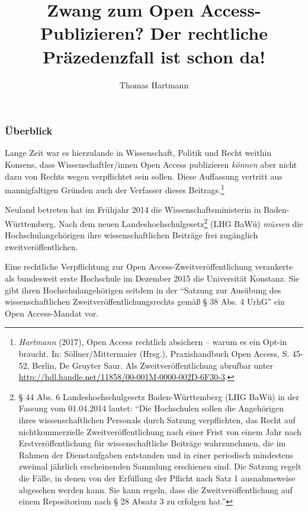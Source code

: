 \documentclass[a4paper,
fontsize=11pt,
oneside,
numbers=noperiodatend,
parskip=half-,
bibliography=totoc,
final
]{scrartcl}
\title{\LARGE{Zwang zum Open Access-Publizieren? Der rechtliche Präzedenzfall ist schon da!}} %
\author{Thomas Hartmann} %
\date{}
\begin{document}
\maketitle
\thispagestyle{fancyplain} 


\hypertarget{uxfcberblick}{%
\subsubsection{Überblick}\label{uxfcberblick}}

Lange Zeit war es hierzulande in Wissenschaft, Politik und Recht weithin
Konsens, dass Wissenschaftler/innen Open Access publizieren
\emph{können} aber nicht dazu von Rechts wegen verpflichtet sein sollen.
Diese Auffassung vertritt aus mannigfaltigen Gründen auch der Verfasser
dieses Beitrags.\footnote{\emph{Hartmann} (2017), Open Access rechtlich
  absichern -- warum es ein Opt-in braucht. In: Söllner/Mittermaier
  (Hrsg.), Praxishandbuch Open Access, S. 45-52, Berlin, De Gruyter
  Saur. Als Zweitveröffentlichung abrufbar unter
  \url{http://hdl.handle.net/11858/00-001M-0000-002D-6F30-3}.}

Neuland betreten hat im Frühjahr 2014 die Wissenschaftsministerin in
Baden-Württemberg. Nach dem neuen Landeshochschulgesetz\footnote{§ 44
  Abs. 6 Landeshochschulgesetz Baden-Württemberg (LHG BaWü) in der
  Fassung vom 01.04.2014 lautet: \enquote{Die Hochschulen sollen die
  Angehörigen ihres wissenschaftlichen Personals durch Satzung
  verpflichten, das Recht auf nichtkommerzielle Zweitveröffentlichung
  nach einer Frist von einem Jahr nach Erstveröffentlichung für
  wissenschaftliche Beiträge wahrzunehmen, die im Rahmen der
  Dienstaufgaben entstanden und in einer periodisch mindestens zweimal
  jährlich erscheinenden Sammlung erschienen sind. Die Satzung regelt
  die Fälle, in denen von der Erfüllung der Pflicht nach Satz 1
  ausnahmsweise abgesehen werden kann. Sie kann regeln, dass die
  Zweitveröffentlichung auf einem Repositorium nach § 28 Absatz 3 zu
  erfolgen hat.}} (LHG BaWü) \emph{müssen} die Hochschulangehörigen ihre
wissenschaftlichen Beiträge frei zugänglich zweitveröffentlichen.

Eine rechtliche Verpflichtung zur Open Access-Zweitveröffentlichung
verankerte als bundesweit erste Hochschule im Dezember 2015 die
Universität Konstanz. Sie gibt ihren Hochschulangehörigen seitdem in der
\enquote{Satzung zur Ausübung des wissenschaftlichen
Zweit\-ver\-öffent\-lich\-ungs\-rechts gemäß § 38 Abs. 4 UrhG} ein Open
Access-Mandat vor.
\end{document}
